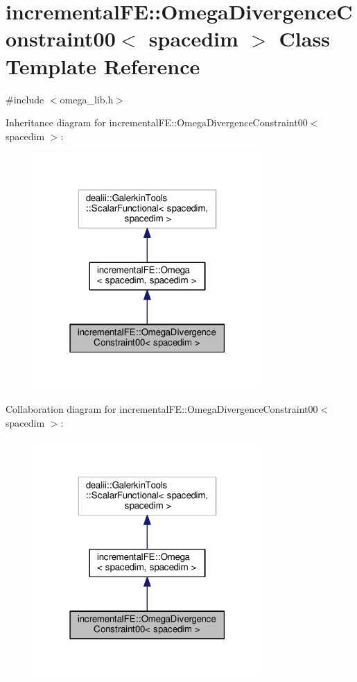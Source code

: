 \hypertarget{classincremental_f_e_1_1_omega_divergence_constraint00}{}\section{incremental\+FE\+:\+:Omega\+Divergence\+Constraint00$<$ spacedim $>$ Class Template Reference}
\label{classincremental_f_e_1_1_omega_divergence_constraint00}


{\ttfamily \#include $<$omega\+\_\+lib.\+h$>$}



Inheritance diagram for incremental\+FE\+:\+:Omega\+Divergence\+Constraint00$<$ spacedim $>$\+:\nopagebreak
\begin{figure}[H]
\begin{center}
\leavevmode
\includegraphics[width=247pt]{classincremental_f_e_1_1_omega_divergence_constraint00__inherit__graph}
\end{center}
\end{figure}


Collaboration diagram for incremental\+FE\+:\+:Omega\+Divergence\+Constraint00$<$ spacedim $>$\+:\nopagebreak
\begin{figure}[H]
\begin{center}
\leavevmode
\includegraphics[width=247pt]{classincremental_f_e_1_1_omega_divergence_constraint00__coll__graph}
\end{center}
\end{figure}
